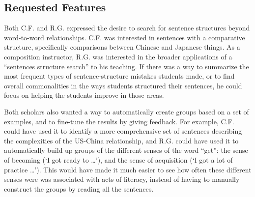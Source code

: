  \subsection{Requested Features}
 Both C.F. and R.G. expressed the desire to search for sentence structures beyond word-to-word relationships. C.F. was interested in sentences with a comparative structure, specifically comparisons between  Chinese and Japanese things. As a composition instructor, R.G. was interested in the broader applications of a ``sentences structure search'' to his teaching.  If there was a way to summarize the most frequent types of sentence-structure mistakes students made, or to find overall commonalities in the ways students structured their sentences, he could focus on helping the students improve in those areas.
 
Both scholars also wanted a way to automatically create groups based on a set of examples, and to fine-tune the results by giving feedback. For example, C.F. could have used it to identify a more comprehensive set of sentences describing the complexities of the US-China relationship, and R.G. could have used it to automatically build up groups of the different senses of the word ``get'': the sense of becoming (`I got ready to \ldots'), and the sense of acquisition (`I got a lot of practice \ldots'). This would have made it much easier to see how often these different senses were was associated with acts of literacy, instead of having to manually construct the groups by reading all the sentences.
 

	
